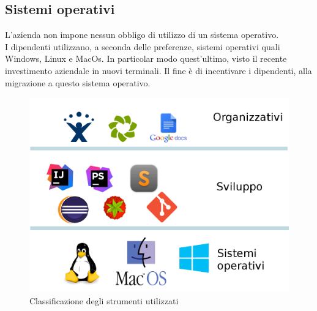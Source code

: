 \subsection{Sistemi operativi}
L'azienda non impone nessun obbligo di utilizzo di un sistema operativo.\\I dipendenti utilizzano, a seconda delle preferenze, sistemi operativi quali Windows, Linux e MacOs. In particolar modo quest'ultimo, visto il recente investimento aziendale in nuovi terminali. Il fine è di incentivare i dipendenti, alla migrazione a questo sistema operativo.
\begin{figure}[h]
\centering
\includegraphics[scale=0.25]{immagini/strumenti}
\caption{Classificazione degli strumenti utilizzati}
\label{fig:strumenti}
\end{figure}




